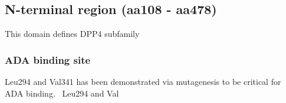 \subsection{N-terminal region (aa108 - aa478)}

This domain defines DPP4 subfamily

\subsubsection{ADA binding site}
Leu294 and Val341 has been demonstrated via mutagenesis to be critical for ADA binding.~\cite{Abbott_1999} Leu294 and Val